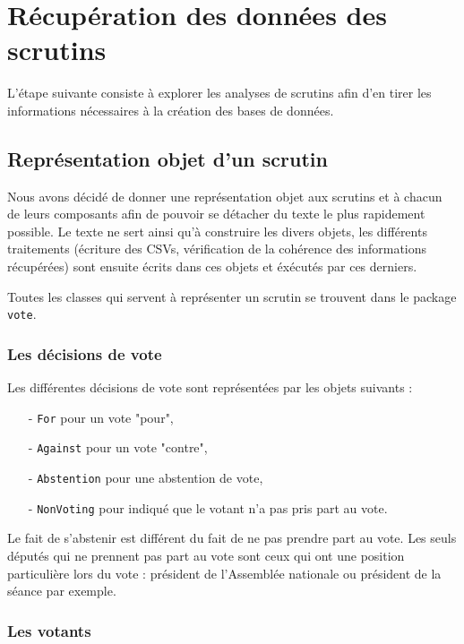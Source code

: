 \section{Récupération des données des scrutins}

L'étape suivante consiste à explorer les analyses de scrutins afin d'en tirer les informations nécessaires à la création des bases de données.

\subsection{Représentation objet d'un scrutin}

Nous avons décidé de donner une représentation objet aux scrutins et à chacun de leurs composants afin de pouvoir se détacher du texte le plus rapidement possible. Le texte ne sert ainsi qu'à construire les divers objets, les différents traitements (écriture des CSVs, vérification de la cohérence des informations récupérées) sont ensuite écrits dans ces objets et éxécutés par ces derniers.

Toutes les classes qui servent à représenter un scrutin se trouvent dans le package \verb|vote|.

\subsubsection*{Les décisions de vote}

Les différentes décisions de vote sont représentées par les objets suivants :
\begin{itemize}
\item[-] \verb|For| pour un vote "pour",
\item[-] \verb|Against| pour un vote "contre",
\item[-] \verb|Abstention| pour une abstention de vote,
\item[-] \verb|NonVoting| pour indiqué que le votant n'a pas pris part au vote.
\end{itemize}

\vspace{0.3cm}
Le fait de s'abstenir est différent du fait de ne pas prendre part au vote. Les seuls députés qui ne prennent pas part au vote sont ceux qui ont une position particulière lors du vote : président de l'Assemblée nationale ou président de la séance par exemple.

\subsubsection*{Les votants}

